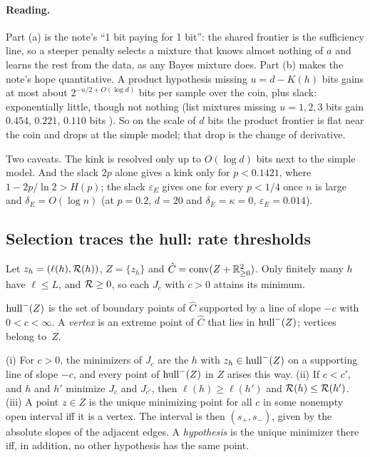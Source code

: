 \paragraph{Reading.} Part (a) is the note's ``1 bit paying for 1 bit'': the shared frontier is the sufficiency line, so a steeper penalty selects a mixture that knows almost nothing of $a$ and learns the rest from the data, as any Bayes mixture does. Part (b) makes the note's hope quantitative. A product hypothesis missing $u=d-K(h)$ bits gains at most about $2^{-u/2+O(\log d)}$ bits per sample over the coin, plus slack: exponentially little, though not nothing (list mixtures missing $u=1,2,3$ bits gain $0.454$, $0.221$, $0.110$ bits ). So on the scale of $d$ bits the product frontier is flat near the coin and drops at the simple model; that drop is the change of derivative.

Two caveats. The kink is resolved only up to $O(\log d)$ bits next to the simple model. And the slack $2p$ alone gives a kink only for $p<0.1421$, where $1-2p/\ln2>H(p)$; the slack $\varepsilon_E$ gives one for every $p<1/4$ once $n$ is large and $\delta_E=O(\log n)$ (at $p=0.2$, $d=20$ and $\delta_E=\kappa=0$, $\varepsilon_E=0.014$).


\subsection{Selection traces the hull: rate thresholds}\label{sec:simplicity:hull}

Let $z_h=(\ell(h),\mathcal R(h))$, $Z=\{z_h\}$ and $\hat C=\mathrm{conv}(Z+\mathbb{R}^2_{\ge0})$. Only finitely many $h$ have $\ell\le L$, and $\mathcal R\ge0$, so each $J_c$ with $c>0$ attains its minimum.

\begin{definition}\label{def:simplicity:hull}
$\mathrm{hull}^{-}(Z)$ is the set of boundary points of $\hat C$ supported by a line of slope $-c$ with $0<c<\infty$. A \emph{vertex} is an extreme point of $\hat C$ that lies in $\mathrm{hull}^{-}(Z)$; vertices belong to~$Z$.
\end{definition}

\begin{lemma}\label{lem:simplicity:hull}
\textup{(i)} For $c>0$, the minimizers of $J_c$ are the $h$ with $z_h\in\mathrm{hull}^{-}(Z)$ on a supporting line of slope $-c$, and every point of $\mathrm{hull}^{-}(Z)$ in $Z$ arises this way.
\textup{(ii)} If $c<c'$, and $h$ and $h'$ minimize $J_c$ and $J_{c'}$, then $\ell(h)\ge\ell(h')$ and $\mathcal R(h)\le\mathcal R(h')$.
\textup{(iii)} A point $z\in Z$ is the unique minimizing point for all $c$ in some nonempty open interval iff it is a vertex. The interval is then $(s_+,s_-)$, given by the absolute slopes of the adjacent edges. A \emph{hypothesis} is the unique minimizer there iff, in addition, no other hypothesis has the same point.

\hfill{}\ \ 
\end{lemma}


